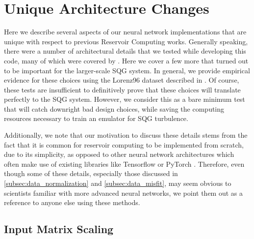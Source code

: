 \section{Unique Architecture Changes}
\label{sec:new_methods}

Here we describe several aspects of our neural network implementations that are
unique with respect to previous Reservoir Computing works.
Generally speaking, there were a number of architectural details that we tested
while developing this code, many of which were covered by
\citet{platt_systematic_2022}.
Here we cover a few more that turned out to be important for the larger-scale
SQG system.
In general, we provide empirical evidence for these choices using the Lorenz96 dataset described
in .
Of course, these tests are insufficient to definitively prove that these choices
will translate perfectly to the SQG system.
However, we consider this as a bare minimum test that will catch downright bad
design choices, while saving the computing resources necessary to train an
emulator for SQG turbulence.

Additionally, we note that our motivation to discuss these details stems from
the fact that it is common for reservoir computing to be
implemented from scratch, due to its simplicity, as opposed to other neural network architectures which
often make use of existing libraries like Tensorflow or PyTorch .
Therefore, even though some of these details, especially those discussed in
\cref{subsec:data_normalization} and \cref{subsec:data_misfit}, may seem
obvious to scientists familiar with more advanced neural networks, we point them
out as a reference to anyone else using these methods.


\subsection{Input Matrix Scaling}

